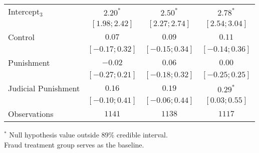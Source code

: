 \begin{table}[h]
\begin{center}
\begin{threeparttable}
\begin{tabular}{l c c c}
Intercept$_3$       & $2.20^{*}$        & $2.50^{*}$        & $2.78^{*}$        \\
                    & $ [ 1.98;  2.42]$ & $ [ 2.27;  2.74]$ & $ [ 2.54;  3.04]$ \\
Control             & $0.07$            & $0.09$            & $0.11$            \\
                    & $ [-0.17;  0.32]$ & $ [-0.15;  0.34]$ & $ [-0.14;  0.36]$ \\
Punishment          & $-0.02$           & $0.06$            & $0.00$            \\
                    & $ [-0.27;  0.21]$ & $ [-0.18;  0.32]$ & $ [-0.25;  0.25]$ \\
Judicial Punishment & $0.16$            & $0.19$            & $0.29^{*}$        \\
                    & $ [-0.10;  0.41]$ & $ [-0.06;  0.44]$ & $ [ 0.03;  0.55]$ \\
\hline
Observations        & $1141$            & $1138$            & $1117$            \\
\hline
\end{tabular}
\begin{tablenotes}[flushleft]
\scriptsize{$^*$ Null hypothesis value outside 89\% credible interval.  \\
Fraud treatment group serves as the baseline.}
\end{tablenotes}
\end{threeparttable}
\label{table:coefficients}
\end{center}
\end{table}
